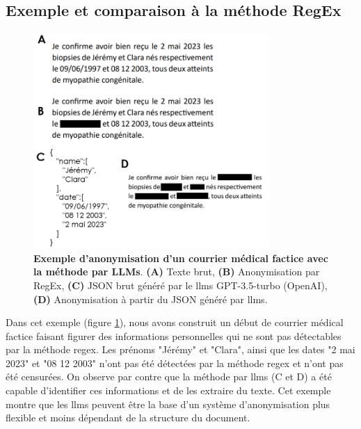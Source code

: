\subsection{Exemple et comparaison à la méthode RegEx}

\begin{figure}[htbp]
 \centering
 \includegraphics[width=0.8\textwidth]{figures/llms_anonym.png}
 \caption[Exemple anonymisation LLMs]{\textbf{Exemple d'anonymisation d'un courrier médical factice avec la méthode par LLMs}. \textbf{(A)} Texte brut, \textbf{(B)} Anonymisation par RegEx, \textbf{(C)} JSON brut généré par le \gls{llms} GPT-3.5-turbo (OpenAI), \textbf{(D)} Anonymisation à partir du JSON généré par \gls{llms}.}
 \label{fig:llms_anonym}
\end{figure}

Dans cet exemple (figure \ref{fig:llms_anonym}), nous avons construit un début de courrier médical factice faisant figurer des informations personnelles qui ne sont pas détectables par la méthode \gls{regex}. Les prénoms "Jérémy" et "Clara", ainsi que les dates "2 mai 2023" et "08 12 2003" n'ont pas été détectées par la méthode \gls{regex} et n'ont pas été censurées. On observe par contre que la méthode par \gls{llms} (C et D) a été capable d'identifier ces informations et de les extraire du texte. Cet exemple montre que les \gls{llms} peuvent être la base d'un système d'anonymisation plus flexible et moins dépendant de la structure du document.

